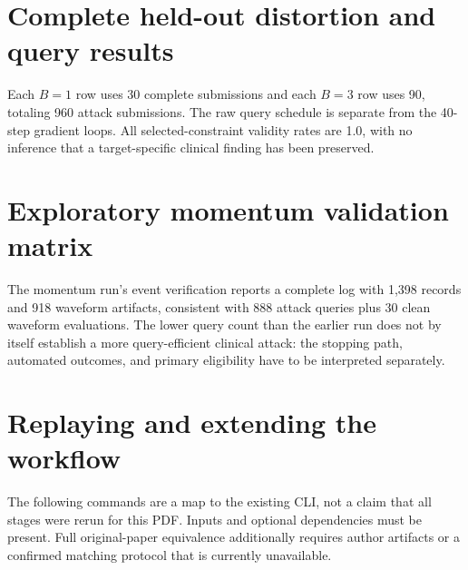 \section{Complete held-out distortion and query results}
\label{app:distortion}
\begin{table}[H]\centering\scriptsize
\resizebox{\linewidth}{!}{}
\caption{Mean distortion of selected valid perturbations and total complete attack queries per held-out cell. PRD and SNR are averaged per selected waveform, so they should not be recomputed from a single ratio of the table's averaged norms. The selected candidate need not be the first successful or largest-distortion query.}
\end{table}
Each $B=1$ row uses 30 complete submissions and each $B=3$ row uses 90, totaling 960 attack submissions. The raw query schedule is separate from the 40-step gradient loops. All selected-constraint validity rates are 1.0, with no inference that a target-specific clinical finding has been preserved.

\section{Exploratory momentum validation matrix}
\label{app:momentum}
\begin{table}[H]\centering\scriptsize
\resizebox{\linewidth}{!}{}
\caption{Separate momentum-decay-0.9 validation experiment. Each row has ten patients and three seeds. It is not a held-out replacement and does not share the earlier final study's historical code identity. Clinical primary evaluability remains absent.}
\end{table}
The momentum run's event verification reports a complete log with 1,398 records and 918 waveform artifacts, consistent with 888 attack queries plus 30 clean waveform evaluations. The lower query count than the earlier run does not by itself establish a more query-efficient clinical attack: the stopping path, automated outcomes, and primary eligibility have to be interpreted separately.

\section{Replaying and extending the workflow}
\label{app:replay}
The following commands are a map to the existing CLI, not a claim that all stages were rerun for this PDF. Inputs and optional dependencies must be present. Full original-paper equivalence additionally requires author artifacts or a confirmed matching protocol that is currently unavailable.


